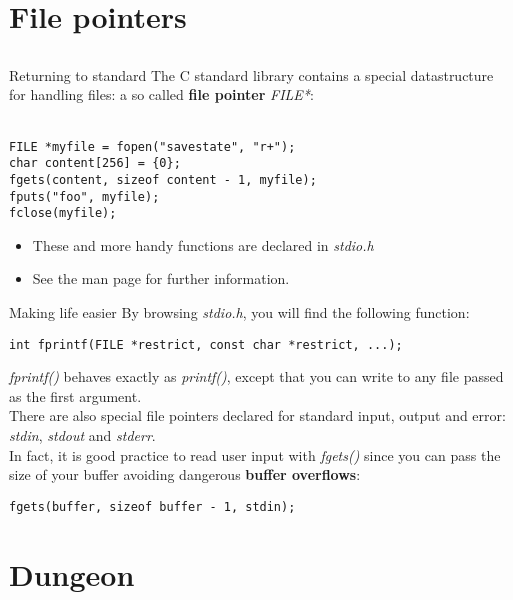 \section{File pointers}
\subsection{}

\begin{frame}[fragile = singleslide]{Returning to standard}
	The C standard library contains a special datastructure for handling files: a so called \textbf{file pointer} \textit{FILE*}:\\\ \\
	
	\begin{lstlisting}
FILE *myfile = fopen("savestate", "r+");
char content[256] = {0};
fgets(content, sizeof content - 1, myfile);
fputs("foo", myfile);
fclose(myfile);
\end{lstlisting}\bigskip

	\begin{itemize}
		\item These and more handy functions are declared in \textit{stdio.h}
		\item See the man page for further information.
	\end{itemize}
\end{frame}

\begin{frame}[fragile = singleslide]{Making life easier}
	By browsing \textit{stdio.h}, you will find the following function:
	\begin{lstlisting}
int fprintf(FILE *restrict, const char *restrict, ...);
\end{lstlisting}
	\textit{fprintf()} behaves exactly as \textit{printf()}, except that you can write to any file passed as the first argument.\\ \bigskip
	There are also special file pointers declared for standard input, output and error:
	\textit{stdin}, \textit{stdout} and \textit{stderr}.\\ \bigskip
	In fact, it is good practice to read user input with \textit{fgets()} since you can pass the size of your buffer avoiding dangerous \textbf{buffer overflows}:
	\begin{lstlisting}
fgets(buffer, sizeof buffer - 1, stdin);
\end{lstlisting}
\end{frame}

\section{Dungeon}
